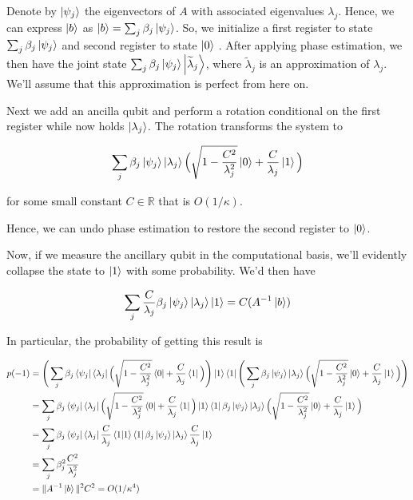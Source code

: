 \documentclass[11pt]{article}
\newcommand\0{\mathbf{0}}
\newcommand\RR{\mathbb{R}}
\newcommand\<{\langle}
\renewcommand\>{\rangle}
\begin{document}
Denote by $\ket{\psi_j}$ the eigenvectors of $A$ with associated eigenvalues $\lambda_j$. Hence, we can express $\ket{b}$ as $\ket{b} = \sum_j \beta_j \ket{\psi_j}$.  So, we initialize a first register to state $\sum_j \beta_j \ket{\psi_j}$ and second register to state $\ket{0}$ . After applying phase estimation, we then have the joint state $\sum_j \beta_j \ket{\psi_j} \ket{\widetilde{\lambda}_j}$, where $\widetilde{\lambda}_j$ is an approximation of $\lambda_j$. We'll assume that this approximation is perfect from here on. 

Next we add an ancilla qubit and perform a rotation conditional on the first register while now holds $\ket{\lambda_j}$. The rotation transforms the system to

\begin{align*}
\sum_j \beta_j \ket{\psi_j} \ket{\lambda_j} \Big(\sqrt{1-\frac{C^2}{\lambda_j^2}}\ket{0} + \frac{C}{\lambda_j}\ket{1}\Big)
\end{align*}

for some small constant $C \in \RR$ that is $O(1/\kappa)$.

Hence, we can undo phase estimation to restore the second register to $\ket{0}$.

Now, if we measure the ancillary qubit in the computational basis, we'll evidently collapse the state to $\ket{1}$ with some probability. We'd then have

\begin{align*}
	\sum_j \frac{C}{\lambda_j} \beta_j \ket{\psi_j} \ket{\lambda_j}\ket{1} = C (A^{-1} \ket{b})
\end{align*}

In particular, the probability of getting this result is 

\begin{align*} 
	p(-1) &= \Bigg(\sum_j \beta_j \bra{\psi_j} \bra{\lambda_j} \Big(\sqrt{1-\frac{C^2}{\lambda_j^2}}\bra{0} + \frac{C}{\lambda_j}\bra{1}\Big) \Bigg)\ket{1}\bra{1} \Bigg(\sum_j \beta_j \ket{\psi_j} \ket{\lambda_j} \Big(\sqrt{1-\frac{C^2}{\lambda_j^2}}\ket{0} + \frac{C}{\lambda_j}\ket{1}\Big)\Bigg) \\
	&= \sum_j \beta_j \bra{\psi_j} \bra{\lambda_j} \Big(\sqrt{1-\frac{C^2}{\lambda_j^2}}\bra{0} + \frac{C}{\lambda_j}\bra{1}\Big) \ket{1}\bra{1} \beta_j \ket{\psi_j} \ket{\lambda_j} \Big(\sqrt{1-\frac{C^2}{\lambda_j^2}}\ket{0} + \frac{C}{\lambda_j}\ket{1}\Big) \\
	&= \sum_j \beta_j \bra{\psi_j} \bra{\lambda_j} \frac{C}{\lambda_j}\bra{1}\ket{1}\bra{1} \beta_j \ket{\psi_j} \ket{\lambda_j} \frac{C}{\lambda_j}\ket{1} \\
	&= \sum_j \beta_j^2 \frac{C^2}{\lambda_j^2} \\
	&= \| A^{-1} \ket{b} \|^2 C^2 = O(1/\kappa^4)
\end{align*} 
\end{document}
